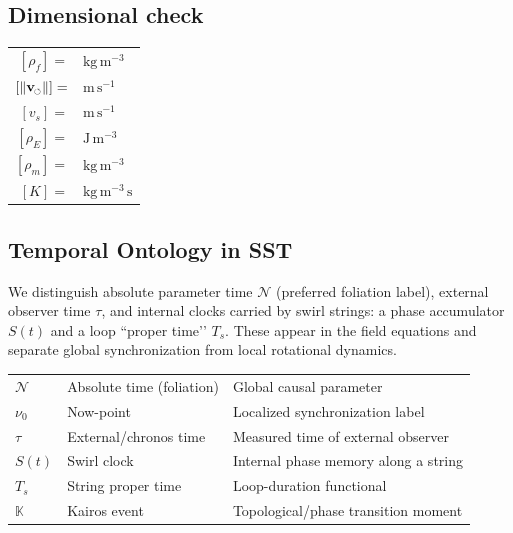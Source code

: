 \documentclass[11pt]{article}
\newcommand{\vscore}{v_s}                                %
\newcommand{\vnorm}{\lVert \mathbf{v}_{\mkern-2mu\scriptscriptstyle\boldsymbol{\circlearrowleft}} \rVert}               %
\newcommand{\rhoF}{\rho_{\!f}}                           %
\newcommand{\rhoE}{\rho_{\!E}}                           %
\newcommand{\rhoM}{\rho_{\!m}}                           %
\begin{document}
	\subsection*{Dimensional check}
	\begin{center}
		\renewcommand{\arraystretch}{1.1}
		\begin{tabularx}{0.7\linewidth}{@{}rl@{}}
			$[\rhoF]=$   & $\mathrm{kg\,m^{-3}}$\\
			$[\vnorm]=$  & $\mathrm{m\,s^{-1}}$\\
			$[\vscore]=$ & $\mathrm{m\,s^{-1}}$\\
			$[\rhoE]=$   & $\mathrm{J\,m^{-3}}$\\
			$[\rhoM]=$   & $\mathrm{kg\,m^{-3}}$\\
			$[K]=$       & $\mathrm{kg\,m^{-3}\,s}$\\
		\end{tabularx}
	\end{center}

	\subsection*{Temporal Ontology in SST}
		We distinguish absolute parameter time $\mathcal{N}$ (preferred foliation label), external observer time $\tau$, and internal clocks carried by swirl strings: a phase accumulator $S(t)$ and a loop “proper time’’ $T_{\!s}$. These appear in the field equations and separate global synchronization from local rotational dynamics.

			\begin{center}
				\scriptsize
				\begin{tabular}{lll}
						$\mathcal{N}$ & Absolute time (foliation) & Global causal parameter \\
						$\nu_0$       & Now-point                 & Localized synchronization label \\
						$\tau$        & External/chronos time     & Measured time of external observer \\
						$S(t)$        & Swirl clock               & Internal phase memory along a string \\
						$T_{\!s}$     & String proper time        & Loop-duration functional \\
						$\mathbb{K}$  & Kairos event              & Topological/phase transition moment \\
                \end{tabular}
			\end{center}
\end{document}
